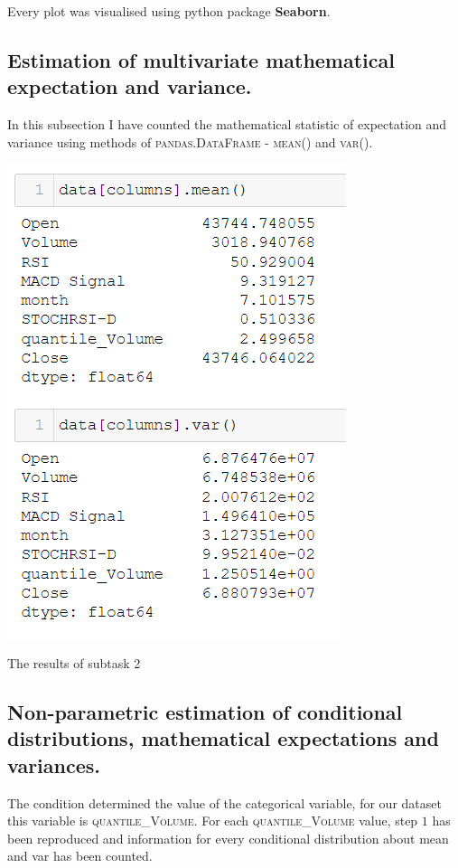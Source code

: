 \documentclass[%
12pt, %
final, %
oneside, %
onecolumn, %
centertags]{article} %
\theoremstyle{plain}
\theoremstyle{definition}
\theoremstyle{remark}
\begin{document}
Every plot was visualised using python package \textbf{Seaborn}.

\subsection{Estimation of multivariate mathematical expectation and variance.}

In this subsection I have counted the mathematical statistic of expectation and variance using methods of \textsc{pandas.DataFrame} - \textsc{mean()} and \textsc{var()}.

\begin{center}
\includegraphics[scale=1]{images/mean_var.png}

The results of subtask 2
\end{center}

\newpage

\subsection{Non-parametric estimation of conditional distributions, mathematical expectations and variances.}

The condition determined the value of the categorical variable, for our dataset this variable is \textsc{quantile\_Volume}. For each \textsc{quantile\_Volume} value, step $1$ has been reproduced and information for every conditional distribution about mean and var has been counted.
\end{document}
